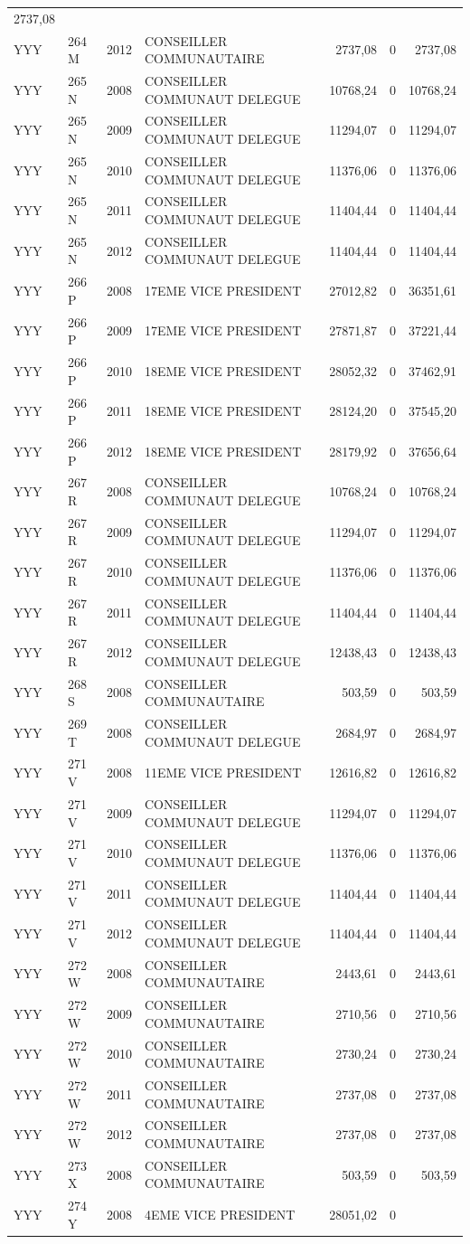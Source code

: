 \begin{longtable}[]{@{}llrlrrr@{}}
2737,08\tabularnewline
YYY & 264 M & 2012 & CONSEILLER COMMUNAUTAIRE & 2737,08 & 0 &
2737,08\tabularnewline
YYY & 265 N & 2008 & CONSEILLER COMMUNAUT DELEGUE & 10768,24 & 0 &
10768,24\tabularnewline
YYY & 265 N & 2009 & CONSEILLER COMMUNAUT DELEGUE & 11294,07 & 0 &
11294,07\tabularnewline
YYY & 265 N & 2010 & CONSEILLER COMMUNAUT DELEGUE & 11376,06 & 0 &
11376,06\tabularnewline
YYY & 265 N & 2011 & CONSEILLER COMMUNAUT DELEGUE & 11404,44 & 0 &
11404,44\tabularnewline
YYY & 265 N & 2012 & CONSEILLER COMMUNAUT DELEGUE & 11404,44 & 0 &
11404,44\tabularnewline
YYY & 266 P & 2008 & 17EME VICE PRESIDENT & 27012,82 & 0 &
36351,61\tabularnewline
YYY & 266 P & 2009 & 17EME VICE PRESIDENT & 27871,87 & 0 &
37221,44\tabularnewline
YYY & 266 P & 2010 & 18EME VICE PRESIDENT & 28052,32 & 0 &
37462,91\tabularnewline
YYY & 266 P & 2011 & 18EME VICE PRESIDENT & 28124,20 & 0 &
37545,20\tabularnewline
YYY & 266 P & 2012 & 18EME VICE PRESIDENT & 28179,92 & 0 &
37656,64\tabularnewline
YYY & 267 R & 2008 & CONSEILLER COMMUNAUT DELEGUE & 10768,24 & 0 &
10768,24\tabularnewline
YYY & 267 R & 2009 & CONSEILLER COMMUNAUT DELEGUE & 11294,07 & 0 &
11294,07\tabularnewline
YYY & 267 R & 2010 & CONSEILLER COMMUNAUT DELEGUE & 11376,06 & 0 &
11376,06\tabularnewline
YYY & 267 R & 2011 & CONSEILLER COMMUNAUT DELEGUE & 11404,44 & 0 &
11404,44\tabularnewline
YYY & 267 R & 2012 & CONSEILLER COMMUNAUT DELEGUE & 12438,43 & 0 &
12438,43\tabularnewline
YYY & 268 S & 2008 & CONSEILLER COMMUNAUTAIRE & 503,59 & 0 &
503,59\tabularnewline
YYY & 269 T & 2008 & CONSEILLER COMMUNAUT DELEGUE & 2684,97 & 0 &
2684,97\tabularnewline
YYY & 271 V & 2008 & 11EME VICE PRESIDENT & 12616,82 & 0 &
12616,82\tabularnewline
YYY & 271 V & 2009 & CONSEILLER COMMUNAUT DELEGUE & 11294,07 & 0 &
11294,07\tabularnewline
YYY & 271 V & 2010 & CONSEILLER COMMUNAUT DELEGUE & 11376,06 & 0 &
11376,06\tabularnewline
YYY & 271 V & 2011 & CONSEILLER COMMUNAUT DELEGUE & 11404,44 & 0 &
11404,44\tabularnewline
YYY & 271 V & 2012 & CONSEILLER COMMUNAUT DELEGUE & 11404,44 & 0 &
11404,44\tabularnewline
YYY & 272 W & 2008 & CONSEILLER COMMUNAUTAIRE & 2443,61 & 0 &
2443,61\tabularnewline
YYY & 272 W & 2009 & CONSEILLER COMMUNAUTAIRE & 2710,56 & 0 &
2710,56\tabularnewline
YYY & 272 W & 2010 & CONSEILLER COMMUNAUTAIRE & 2730,24 & 0 &
2730,24\tabularnewline
YYY & 272 W & 2011 & CONSEILLER COMMUNAUTAIRE & 2737,08 & 0 &
2737,08\tabularnewline
YYY & 272 W & 2012 & CONSEILLER COMMUNAUTAIRE & 2737,08 & 0 &
2737,08\tabularnewline
YYY & 273 X & 2008 & CONSEILLER COMMUNAUTAIRE & 503,59 & 0 &
503,59\tabularnewline
YYY & 274 Y & 2008 & 4EME VICE PRESIDENT & 28051,02 & 0 &

\end{longtable}
